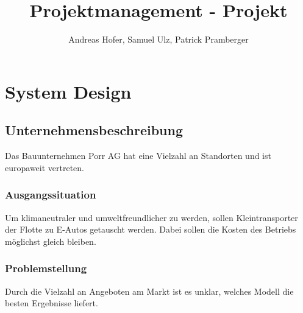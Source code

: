 \documentclass{article}
\title{\vspace{-1cm}Projektmanagement - Projekt}
\author{Andreas Hofer, Samuel Ulz, Patrick Pramberger}
\begin{document}
	\maketitle
	\tableofcontents
	\section{System Design}
	\subsection{Unternehmensbeschreibung}
	Das Bauunternehmen Porr AG hat eine Vielzahl an Standorten und ist europaweit vertreten.
	\subsubsection{Ausgangssituation}
	Um klimaneutraler und umweltfreundlicher zu werden, sollen Kleintransporter der Flotte zu E-Autos getauscht werden. Dabei sollen die Kosten des Betriebs möglichst gleich bleiben.
	\subsubsection{Problemstellung}
	Durch die Vielzahl an Angeboten am Markt ist es unklar, welches Modell die besten Ergebnisse liefert.
\end{document}
